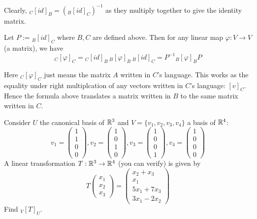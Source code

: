 \documentclass[11pt]{article}
\begin{document}
Clearly, \({}_C[id]_B=({}_B[id]_C)^{-1}\) as they multiply together to give the identity matrix.

\begin{theorem}
  Let \(P:={}_B[id]_C\) where \(B,C\) are defined above. Then for any linear map \(\varphi:V\to V\) (a matrix), we have 
  \[{}_C[\varphi]_C={}_C[id]_B\,{}_B[\varphi]_B\,{}_B[id]_C=P^{-1} {}_B[\varphi]_B P\]
\end{theorem}
Here \({}_C[\varphi]_C\) just means the matrix \(A\) written in \(C\)'s language. This works as the equality under right multiplcation of any vectors written in \(C\)'s language: \([v]_C\). Hence the formula above translates a matrix written in \(B\) to the same matrix written in \(C\).

\begin{exercise}
  Consider \(U\) the canonical basis of \(\mathbb{R}^3\) and \(V=\{v_1,v_2,v_3,v_4\}\) a basis of \(\mathbb{R}^4\):
  \[v_1=\begin{pmatrix}1\\1\\0\\0\end{pmatrix}, v_2=\begin{pmatrix}1\\0\\1\\0\end{pmatrix}, v_3=\begin{pmatrix}1\\0\\0\\1\end{pmatrix}, v_4=\begin{pmatrix}1\\0\\0\\0\end{pmatrix}\]
  A linear transformation \(T:\mathbb{R}^3\to\mathbb{R}^4\) (you can verify) is given by
  \[T\begin{pmatrix}x_1\\x_2\\x_3\end{pmatrix}=\begin{pmatrix}x_2+x_3\\x_1\\5x_1+7x_3\\3x_1-2x_2\end{pmatrix}\]
  Find \({}_V[T]_U\).
\end{exercise}
\end{document}
